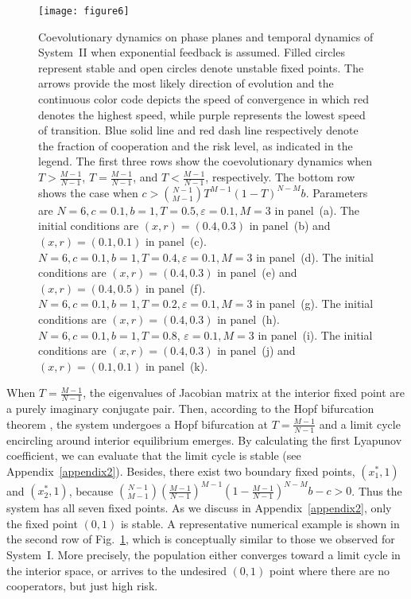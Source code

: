 \documentclass[9pt]{elife}
\begin{document}
\begin{figure}
\begin{fullwidth}
\hspace{0cm}\texttt{[image: figure6]}
\caption{Coevolutionary dynamics on phase planes and temporal dynamics of System~II when exponential feedback is assumed. Filled circles represent stable and open circles denote unstable fixed points. The arrows provide the most likely direction of evolution and the continuous color code depicts the speed of convergence in which red denotes the highest speed, while purple represents the lowest speed of transition. Blue solid line and red dash line respectively denote the fraction of cooperation and the risk level, as indicated in the legend. The first three rows show the coevolutionary dynamics when $T>\frac{M-1}{N-1}$, $T=\frac{M-1}{N-1}$, and $T<\frac{M-1}{N-1}$, respectively. The bottom row shows the case when $c>\binom{N-1}{M-1}T^{M-1}(1-T)^{N-M}b$. Parameters are $N=6, c=0.1, b=1, T=0.5, \varepsilon=0.1, M=3$ in panel~(a). The initial conditions are $(x, r)=(0.4, 0.3)$ in panel~(b) and $(x, r)=(0.1, 0.1)$ in panel~(c). $N=6, c=0.1, b=1, T=0.4, \varepsilon=0.1, M=3$ in panel~(d). The initial conditions are $(x, r)=(0.4, 0.3)$ in panel~(e) and $(x, r)=(0.4, 0.5)$ in panel~(f). $N=6, c=0.1, b=1, T=0.2, \varepsilon=0.1, M=3$ in panel~(g). The initial conditions are $(x, r)=(0.4, 0.3)$ in panel~(h). $N=6, c=0.1, b=1, T=0.8$, $\varepsilon=0.1, M=3$ in panel~(i). The initial conditions are $(x, r)=(0.4, 0.3)$ in panel~(j) and $(x, r)=(0.1, 0.1)$ in panel~(k).}
\label{fig6}
\end{fullwidth}
\end{figure}

When $T=\frac{M-1}{N-1}$, the eigenvalues of Jacobian matrix at the interior fixed point are a purely imaginary conjugate pair. Then, according to the Hopf bifurcation theorem \citep{kuznetsov1998elements,guckenheimer2013nonlinear}, the system undergoes a Hopf bifurcation at $T=\frac{M-1}{N-1}$ and a limit cycle encircling around interior equilibrium emerges. By calculating the first Lyapunov coefficient, we can evaluate that the limit cycle is stable (see Appendix~\ref{appendix2}). Besides, there exist two boundary fixed points, $(x_{1}^{*}, 1)$ and $(x_{2}^{*}, 1)$, because $\binom{N-1}{M-1}(\frac{M-1}{N-1})^{M-1}(1-\frac{M-1}{N-1})^{N-M}b-c>0$. Thus the system has all seven fixed points. As we discuss in Appendix~\ref{appendix2}, only the fixed point $(0, 1)$ is stable. A representative numerical example is shown in the second row of Fig.~\ref{fig6}, which is conceptually similar to those we observed for System~I. More precisely, the population either converges toward a limit cycle in the interior space, or arrives to the undesired $(0, 1)$ point where there are no cooperators, but just high risk.
\end{document}
